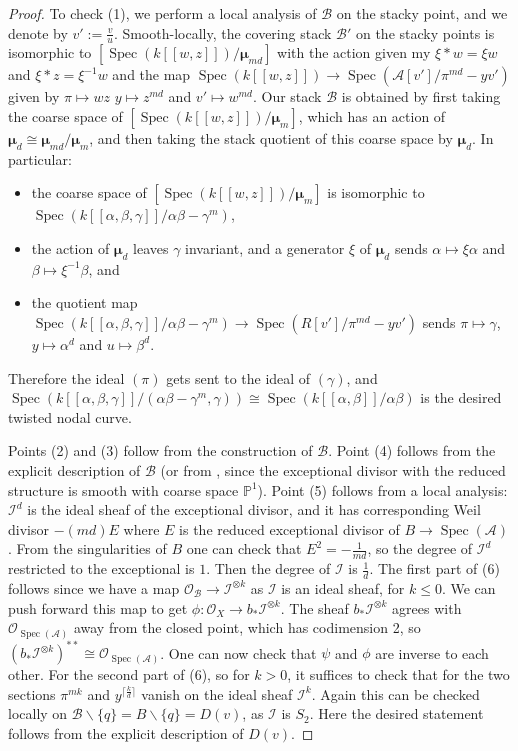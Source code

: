 \documentclass{amsart}
\newcommand{\bP}{\mathbb{P}}
\newcommand{\cA}{\mathcal{A}}
\newcommand{\cB}{\mathcal{B}}
\newcommand{\cI}{\mathcal{I}}
\newcommand{\cO}{\mathcal{O}}
\newcommand{\spec}{\operatorname{Spec}}
\newcommand{\bmu}{\bm{\mu}}
\theoremstyle{definition}
\begin{document}
\begin{proof}
To check (1), we perform a local analysis of $\cB$ on the stacky point, and we denote by $v':=\frac{v}{u}$. Smooth-locally, the covering stack $\cB'$ on the stacky points is isomorphic to $[\spec(k[\![w,z]\!])/\bmu_{md}]$ with the action given my $\xi*w = \xi w$ and $\xi* z = \xi^{-1}w$ and the map $\spec(k[\![w,z]\!])\to \spec(\cA[v']/\pi^{md} - yv')$ given by $\pi\mapsto wz$ $y\mapsto z^{md}$ and $v'\mapsto w^{md}$. Our stack $\cB$ is obtained by first taking the coarse space of $[\spec(k[\![w,z]\!])/\bmu_{m}]$, which has an action of $\bmu_d \cong \bmu_{md}/\bmu_m$, and then taking the stack quotient of this coarse space by $\bmu_d$. In particular:
\begin{itemize}
    \item the coarse space of $[\spec(k[\![w,z]\!])/\bmu_{m}]$
is isomorphic to $\spec(k[\![\alpha,\beta,\gamma]\!]/\alpha\beta - \gamma^m)$, 
\item the action of $\bmu_d$ leaves $\gamma$ invariant, and a generator $\xi$ of $\bmu_d$ sends $\alpha\mapsto \xi\alpha$ and $\beta \mapsto \xi^{-1} \beta$, and
\item the quotient map $\spec(k[\![\alpha,\beta,\gamma]\!]/\alpha\beta - \gamma^m)\to \spec(R[v']/\pi^{md} - yv') $ sends $\pi\mapsto \gamma$, $y\mapsto \alpha^d$ and $u\mapsto \beta^d$.
\end{itemize}   Therefore the ideal $(\pi)$ gets sent to the ideal of $(\gamma)$, and $\spec(k[\![\alpha,\beta,\gamma]\!]/(\alpha\beta - \gamma^m, \gamma))\cong \spec(k[\![\alpha,\beta]\!]/\alpha\beta)$ is the desired twisted nodal curve.

Points (2) and (3) follow from the construction of $\cB$. Point (4) follows from the explicit description of $\cB$ (or from \cite{GS17}, since the exceptional divisor with the reduced structure is smooth with coarse space $\bP^1$). Point (5) follows from a local analysis: $\cI^{d}$ is the ideal sheaf of the exceptional divisor, and it has corresponding Weil divisor $-(md)E$ where $E$ is the reduced exceptional divisor of $B\to \spec(\cA)$. From the singularities of $B$ one can check that $E^2=-\frac{1}{md}$, so the degree of $\cI^{d}$ restricted to the exceptional is $1$. Then the degree of $\cI$ is $\frac{1}{d}$.
The first part of (6) follows since we have a map $\cO_{\cB}\to \cI^{\otimes k}$ as
$\cI$ is an ideal sheaf, for $k\le 0$. We can push forward this map to get $\phi:\cO_X\to b_*\cI^{\otimes k}$. The sheaf $b_*\cI^{\otimes k}$ agrees with
$\cO_{\spec(\cA)}$ away from the closed point, which has codimension 2, so $(b_*\cI^{\otimes k})^{**}\cong \cO_{\spec(\cA)}$. One can now check that $\psi$ and $\phi$ are inverse to each other. For the second part of (6), so for $k>0$, it suffices to check that for the two sections $\pi^{mk}$ and $y^{\lceil \frac{k}{d}\rceil}$ vanish on the ideal sheaf $\cI^{k}$. Again this can be checked locally on $\cB\smallsetminus \{q\} = B\smallsetminus \{q\} = D(v)$, as $\cI$ is $S_2$. Here the desired statement follows from the explicit description of $D(v)$. 


\end{proof}
\end{document}
